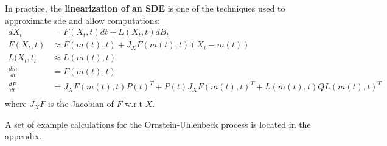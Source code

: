 In practice, the \textbf{linearization of an SDE} is one of the techniques used to approximate \gls{sde} and 
allow computations:
\begin{align}
    dX_t &= F(X_t, t)dt + L(X_t, t)dB_t \\
    F(X_t, t) &\approx F(m(t), t) + J_X F(m(t),t)(X_t - m(t)) \\
    L(X_t, t] &\approx L(m(t),t) \\
    \frac{dm}{dt} &= F(m(t), t) \\
    \frac{dP}{dt} &= J_X F(m(t),t) P(t)^{T} + P(t)J_X F(m(t),t)^{T} + L(m(t), t)QL(m(t),t)^{T} \\
\end{align}
where $J_X F$ is the Jacobian of $F$ w.r.t $X$.

A set of example calculations for the Ornstein-Uhlenbeck process is located in the appendix.